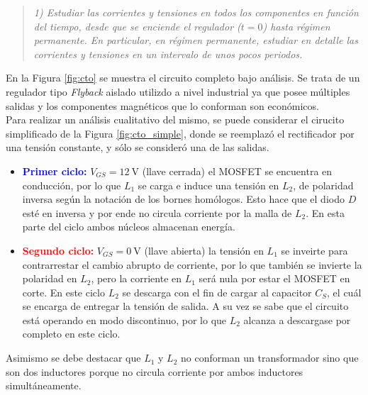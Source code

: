 \begin{quote} \textit{1) Estudiar las corrientes y tensiones en todos los componentes en función del tiempo, desde que se enciende el regulador ($t=0$) hasta régimen permanente. En particular, en régimen permanente, estudiar en detalle las corrientes y tensiones en un intervalo de unos pocos periodos.}
\end{quote}


En la Figura \ref{fig:cto} se muestra el circuito completo bajo análisis. Se trata de un regulador tipo \textit{Flyback} aislado utilizdo a nivel industrial ya que posee múltiples salidas y los componentes magnéticos que lo conforman son económicos.\\
\indent Para realizar un análisis cualitativo del mismo, se puede considerar el cirucito simplificado de la Figura \ref{fig:cto_simple}, donde se reemplazó el rectificador por una tensión constante, y sólo se consideró una de las salidas.


\begin{itemize}
	\item \textcolor{blue}{\textbf{Primer ciclo:}} $V_{GS}=\SI{12}{\volt}$ (llave cerrada) el MOSFET se encuentra en conducción, por lo que $L_1$ se carga e induce una tensión en $L_2$, de polaridad inversa según la notación de los bornes homólogos. Esto hace que el diodo $D$ esté en inversa y por ende no circula corriente por la malla de $L_2$. En esta parte del ciclo ambos núcleos almacenan energía.

	\item \textcolor{red}{\textbf{Segundo ciclo:}} $V_{GS} = \SI{0}{\volt}$ (llave abierta) la tensión en $L_1$ se inveirte para contrarrestar el cambio abrupto de corriente, por lo que también se invierte la polaridad en $L_2$, pero la corriente en $L_1$ será nula por estar el MOSFET en corte.
		En este ciclo $L_2$ se descarga con el fin de cargar al capacitor $C_S$, el cuál se encarga de entregar la tensión de salida. A su vez se sabe que el circuito está operando en modo discontinuo, por lo que $L_2$ alcanza a descargase por completo en este ciclo.
\end{itemize}


Asimismo se debe destacar que $L_1$ y $L_2$ no conforman un transformador sino que son dos inductores porque no circula corriente por ambos inductores simultáneamente.


